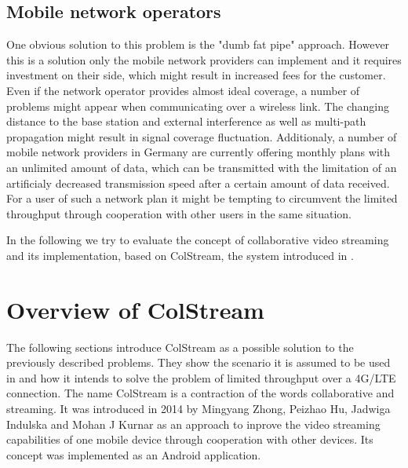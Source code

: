 \subsection{Mobile network operators}
One obvious solution to this problem is the "dumb fat pipe" approach. However this is a solution only the mobile network providers can implement and it requires investment on their side, which might result in increased fees for the customer. Even if the network operator provides almost ideal coverage, a number of problems might appear when communicating over a wireless link. The changing distance to the base station and external interference as well as multi-path propagation might result in signal coverage fluctuation.
Additionaly, a number of mobile network providers in Germany are currently offering monthly plans with an unlimited amount of data, which can be transmitted with the limitation of an artificialy decreased transmission speed after a certain amount of data received. For a user of such a network plan it might be tempting to circumvent the limited throughput through cooperation with other users in the same situation.

In the following we try to evaluate the concept of collaborative video streaming and its implementation, based on ColStream, the system introduced in \cite{ColStream}.


\section{Overview of ColStream}
The following sections introduce ColStream as a possible solution to the previously described problems. They show the scenario it is assumed to be used in and how it intends to solve the problem of limited throughput over a 4G/LTE connection.
The name ColStream is a contraction of the words collaborative and streaming. It was introduced in 2014 by Mingyang Zhong, Peizhao Hu, Jadwiga Indulska and Mohan J Kurnar as an approach to inprove the video streaming capabilities of one mobile device through cooperation with other devices. Its concept was implemented as an Android application.
